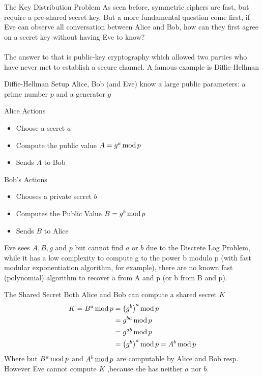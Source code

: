 \begin{parag}{The Key Distribution Problem}
    As seen before, symmetric ciphers are fast, but require a pre-shared secret key. But a more fundamental question come first, if Eve can observe all conversation between Alice and Bob, how can they first agree on a secret key without having Eve to know?\\
	$ $\\
	The answer to that is public-key cryptography which allowed two parties who have never met to establish a secure channel. A famous example is Diffie-Hellman
\end{parag}
\begin{parag}{Diffie-Hellman Setup}
    Alice, Bob (and Eve) know a large public parameters: a prime number $p$ and a generator $g$
	\begin{subparag}{Alice Actions}
	    \begin{itemize}
	        \item Choose a  secret $a$
	        \item Compute the public value $A =  g^{a} \operatorname{mod} p$
	        \item Sends $A$ to Bob
	    \end{itemize}
	\end{subparag}
	\begin{subparag}{Bob's Actions}
	    \begin{itemize}
	        \item Chooses a private secret $b$
	        \item Computes the Public Value $B = g^{b} \operatorname{mod} p$
	        \item Sends $B$ to Alice
	    \end{itemize}
	\end{subparag}
	\begin{framedremark}
	Eve sees $A, B, g$ and $p$ but cannot find $a$ or $b$ due to the Discrete Log Problem, while it has a low complexity to compute g to the power b modulo p (with fast modular exponentiation algorithm, for example), there are no known fast (polynomial) algorithm to recover a from A and p (or b from B and p).
	\end{framedremark}
\end{parag}
\begin{parag}{The Shared Secret}
    Both Alice and Bob can compute a shared secret $K$
	\begin{align*} 
		K = B^{a} \Mod p &= \left(g^{b}\right)^{a} \Mod p\\
						 &= g^{ba} \Mod p\\
						 &= g^{ab} \Mod p\\
						 &= \left(g^{b}\right)^{a} \Mod p = A^{b} \Mod p
	\end{align*}
	Where but $B^{a} \operatorname{mod} p$ and $A^{b} \operatorname{mod} p$ are computable by Alice and Bob resp. However Eve cannot compute $K$ ,because she has neither $a$ nor $b$.
\end{parag}

